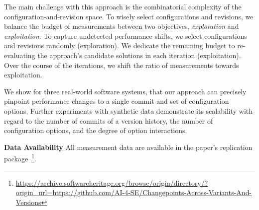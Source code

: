 \documentclass[utf8,biblatex]{lni}
\begin{document}
The main challenge with this approach is the combinatorial complexity of the configuration-and-revision space. To wisely select configurations and revisions, we balance the budget of measurements between two objectives, \textit{exploration} and \textit{exploitation}. To capture undetected performance shifts, we select configurations and revisions randomly ({exploration}). We dedicate the remaining budget to re-evaluating the approach's candidate solutions in each iteration ({exploitation}). Over the course of the iterations, we shift the ratio of measurements towards exploitation. 

We show for three real-world software systems, that our approach can precisely pinpoint performance changes to a single commit and set of configuration options. Further experiments with synthetic data demonstrate its scalability with regard to the number of commits of a version history, the number of configuration options, and the degree of option interactions.

\textbf{Data Availability}
All measurement data are available in the paper's replication package~\footnote{\url{https://archive.softwareheritage.org/browse/origin/directory/?origin_url=https://github.com/AI-4-SE/Changepoints-Across-Variants-And-Versions}}.
\printbibliography
\end{document}
